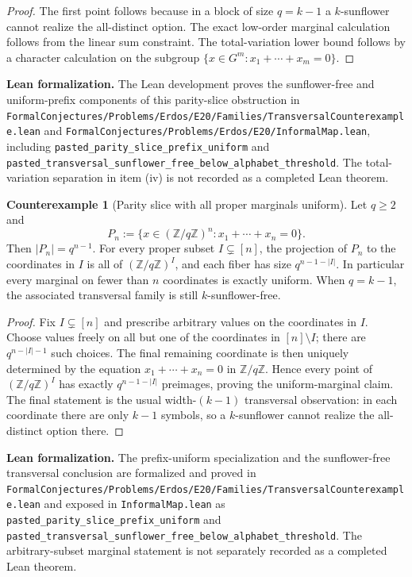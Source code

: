 \documentclass[11pt]{article}
\theoremstyle{definition}
\newtheorem{counterexample}[theorem]{Counterexample}
\newcommand{\Z}{\mathbb{Z}}
\newcommand{\1}{\mathbf{1}}
\newcommand{\leannote}[1]{\par\smallskip\noindent\textbf{Lean formalization.} #1\par\smallskip}
\begin{document}
\begin{proof}
The first point follows because in a block of size $q=k-1$ a $k$-sunflower cannot realize the all-distinct option. The exact low-order marginal calculation follows from the linear sum constraint. The total-variation lower bound follows by a character calculation on the subgroup $\{x\in G^m: x_1+\cdots+x_m=0\}$.
\end{proof}

\leannote{The Lean development proves the sunflower-free and uniform-prefix components of this parity-slice obstruction in \texttt{FormalConjectures/Problems/Erdos/E20/Families/TransversalCounterexample.lean} and \texttt{FormalConjectures/Problems/Erdos/E20/InformalMap.lean}, including \texttt{pasted\_parity\_slice\_prefix\_uniform} and \texttt{pasted\_transversal\_sunflower\_free\_below\_alphabet\_threshold}. The total-variation separation in item (iv) is not recorded as a completed Lean theorem.}

\begin{counterexample}[Parity slice with all proper marginals uniform]\label{ce:parity-proper-marginals}
Let $q\ge 2$ and
\[
P_n:=\{x\in (\Z/q\Z)^n: x_1+\cdots+x_n=0\}.
\]
Then $|P_n|=q^{n-1}$. For every proper subset $I\subsetneq [n]$, the projection of $P_n$ to the coordinates in $I$ is all of $(\Z/q\Z)^I$, and each fiber has size $q^{n-1-|I|}$. In particular every marginal on fewer than $n$ coordinates is exactly uniform. When $q=k-1$, the associated transversal family is still $k$-sunflower-free.
\end{counterexample}

\begin{proof}
Fix $I\subsetneq [n]$ and prescribe arbitrary values on the coordinates in $I$. Choose values freely on all but one of the coordinates in $[n]\setminus I$; there are $q^{n-|I|-1}$ such choices. The final remaining coordinate is then uniquely determined by the equation $x_1+\cdots+x_n=0$ in $\Z/q\Z$. Hence every point of $(\Z/q\Z)^I$ has exactly $q^{n-1-|I|}$ preimages, proving the uniform-marginal claim. The final statement is the usual width-$(k-1)$ transversal observation: in each coordinate there are only $k-1$ symbols, so a $k$-sunflower cannot realize the all-distinct option there.
\end{proof}

\leannote{The prefix-uniform specialization and the sunflower-free transversal conclusion are formalized and proved in \texttt{FormalConjectures/Problems/Erdos/E20/Families/TransversalCounterexample.lean} and exposed in \texttt{InformalMap.lean} as \texttt{pasted\_parity\_slice\_prefix\_uniform} and \texttt{pasted\_transversal\_sunflower\_free\_below\_alphabet\_threshold}. The arbitrary-subset marginal statement is not separately recorded as a completed Lean theorem.}
\end{document}
